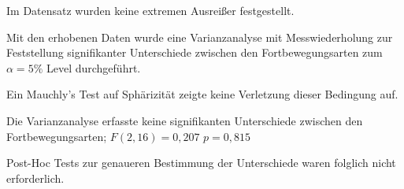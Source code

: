                     Im Datensatz wurden keine extremen Ausreißer %
                    festgestellt.

                    Mit den erhobenen Daten wurde eine Varianzanalyse mit Messwiederholung zur Feststellung signifikanter Unterschiede zwischen den Fortbewegungsarten zum $\alpha = 5\%$ Level durchgeführt.






                    Ein Mauchly's Test auf Sphärizität zeigte keine Verletzung dieser Bedingung auf.

                    Die Varianzanalyse erfasste keine signifikanten Unterschiede zwischen den Fortbewegungsarten; $F(2,16) = 0,207$  $p = 0,815$

                    Post-Hoc Tests zur genaueren Bestimmung der Unterschiede waren folglich nicht erforderlich.
%




%


